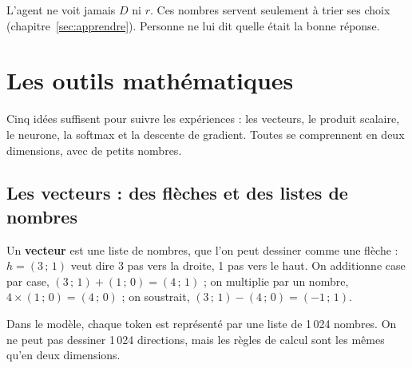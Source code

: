 \documentclass[fontsize=10pt,paper=a4,parskip=half-]{scrartcl}
\newcommand{\lead}[1]{{\fontsize{12}{16.5}\selectfont\color{ink!85!black}#1\par}\vspace{0.3em}}
\newcommand{\vect}[2]{(#1\,;\,#2)}
\begin{document}
L'agent ne voit jamais $D$ ni $r$. Ces nombres servent seulement à trier ses choix
(chapitre~\ref{sec:apprendre}). Personne ne lui dit quelle était la bonne réponse.

\section{Les outils mathématiques}
\label{sec:outils}

\lead{Cinq idées suffisent pour suivre les expériences : les vecteurs, le produit
scalaire, le neurone, la softmax et la descente de gradient. Toutes se comprennent en
deux dimensions, avec de petits nombres.}

\subsection{Les vecteurs : des flèches et des listes de nombres}
\begin{minipage}[t]{0.54\linewidth}
\vspace{0pt}
Un \textbf{vecteur} est une liste de nombres, que l'on peut dessiner comme une flèche :
$h=\vect{3}{1}$ veut dire 3 pas vers la droite, 1 pas vers le haut. On additionne case
par case, $\vect{3}{1} + \vect{1}{0} = \vect{4}{1}$ ; on multiplie par un nombre,
$4 \times \vect{1}{0} = \vect{4}{0}$ ; on soustrait, $\vect{3}{1} - \vect{4}{0} = \vect{-1}{1}$.

Dans le modèle, chaque token est représenté par une liste de 1\,024 nombres. On ne peut
pas dessiner 1\,024 directions, mais les règles de calcul sont les mêmes qu'en deux
dimensions.
\end{minipage}\hfill
\begin{minipage}[t]{0.42\linewidth}
\vspace{0pt}\centering
{}
\label{fig:vecteurs}
\end{minipage}
\end{document}
